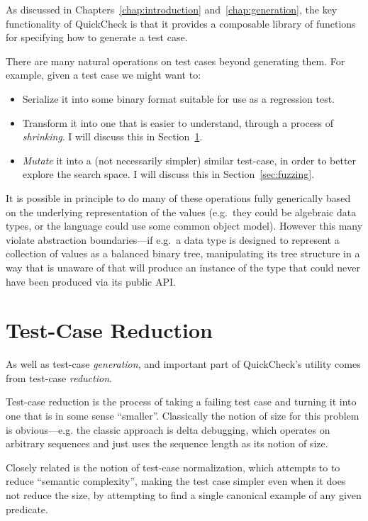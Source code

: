 As discussed in Chapters~\ref{chap:introduction} and~\ref{chap:generation},
the key functionality of QuickCheck is that it provides a composable library of functions for specifying how to generate a test case.

There are many natural operations on test cases beyond generating them.
For example,
given a test case we might want to:

\begin{itemize}
\item Serialize it into some binary format suitable for use as a regression test.
\item Transform it into one that is easier to understand,
through a process of \emph{shrinking}.
I will discuss this in Section~\ref{sec:shrinking}.
\item \emph{Mutate} it into a (not necessarily simpler) similar test-case,
in order to better explore the search space. I will discuss this in Section~\ref{sec:fuzzing}.
\end{itemize}

It is possible in principle to do many of these operations fully generically based on the underlying representation of the values (e.g.~they could be algebraic data types,
or the language could use some common object model).
However this many violate abstraction boundaries---if
e.g.\ a data type is designed to represent a collection of values as a balanced binary tree,
manipulating its tree structure in a way that is unaware of that will produce an instance of the type that could never have been produced via its public API.\ 



\section{Test-Case Reduction}\label{sec:shrinking}

As well as test-case \emph{generation},
and important part of QuickCheck's utility comes from test-case \emph{reduction}.

Test-case reduction is the process of taking a failing test case and turning it into one that is in some sense ``smaller''.
Classically the notion of size for this problem is obvious---e.g.
the classic approach is delta debugging\cite{DBLP:journals/tse/ZellerH02},
which operates on arbitrary sequences and just uses the sequence length as its notion of size.

Closely related is the notion of test-case normalization\cite{DBLP:conf/issta/GroceHK17},
which attempts to to reduce ``semantic complexity'',
making the test case simpler even when it does not reduce the size,
by attempting to find a single canonical example of any given predicate.

